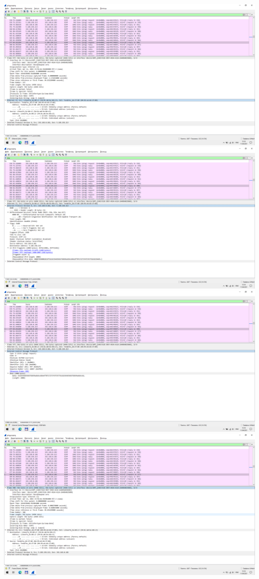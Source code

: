 \includegraphics{screenshots/ping_2000_request_1}
\includegraphics{screenshots/ping_2000_request_2}
\includegraphics{screenshots/ping_2000_request_3}
\includegraphics{screenshots/ping_2000_response_1}

